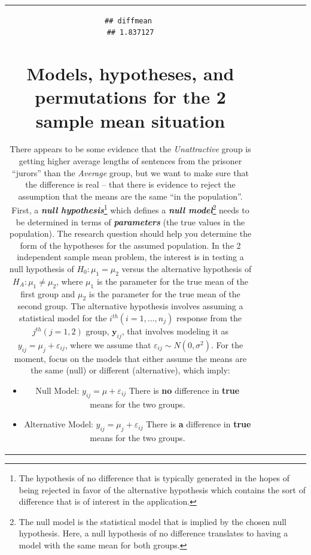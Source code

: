 \documentclass[]{book}
\let\rmarkdownfootnote\footnote%
\def\footnote{\protect\rmarkdownfootnote}
\theoremstyle{definition}
\theoremstyle{definition}
\theoremstyle{remark}
\begin{document}
\begin{longtable}[]{@{}ccccccc@{}}
\begin{minipage}[b]{0.10\columnwidth}
\begin{verbatim}
## diffmean 
## 1.837127
\end{verbatim}

\section{Models, hypotheses, and permutations for the 2 sample mean
situation}\label{section2-3}

There appears to be some evidence that the \emph{Unattractive} group is
getting higher average lengths of sentences from the prisoner ``jurors''
than the \emph{Average} group, but we want to make sure that the
difference is real -- that there is evidence to reject the assumption
that the means are the same ``in the population''. First, a
\textbf{\emph{null hypothesis}}\footnote{The hypothesis of no difference
  that is typically generated in the hopes of being rejected in favor of
  the alternative hypothesis which contains the sort of difference that
  is of interest in the application.} which defines a \textbf{\emph{null
model}}\footnote{The null model is the statistical model that is implied
  by the chosen null hypothesis. Here, a null hypothesis of no
  difference translates to having a model with the same mean for both
  groups.} needs to be determined in terms of \textbf{\emph{parameters}}
(the true values in the population). The research question should help
you determine the form of the hypotheses for the assumed population. In
the 2 independent sample mean problem, the interest is in testing a null
hypothesis of \(H_0: \mu_1 = \mu_2\) versus the alternative hypothesis
of \(H_A: \mu_1 \ne \mu_2\), where \(\mu_1\) is the parameter for the
true mean of the first group and \(\mu_2\) is the parameter for the true
mean of the second group. The alternative hypothesis involves assuming a
statistical model for the \(i^{th} (i=1,\ldots,n_j)\) response from the
\(j^{th} (j=1,2)\) group, \(\boldsymbol{y}_{ij}\), that involves
modeling it as \(y_{ij} = \mu_j + \varepsilon_{ij}\), where we assume
that \(\varepsilon_{ij} \sim N(0,\sigma^2)\). For the moment, focus on
the models that either assume the means are the same (null) or different
(alternative), which imply:

\begin{itemize}
\item
  Null Model: \(y_{ij} = \mu + \varepsilon_{ij}\) There is \textbf{no}
  difference in \textbf{true} means for the two groups.
\item
  Alternative Model: \(y_{ij} = \mu_j + \varepsilon_{ij}\) There is
  \textbf{a} difference in \textbf{true} means for the two groups.
\end{itemize}


\end{minipage}
\end{longtable}
\end{document}
